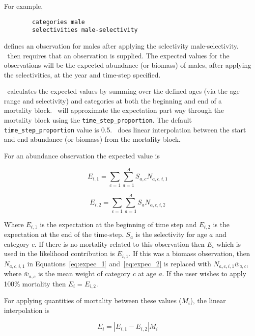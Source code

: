 For example,

{\small{\begin{verbatim}
		categories male
		selectivities male-selectivity
\end{verbatim}}}

defines an observation for males after applying the selectivity male-selectivity. \CNAME\ then requires that an observation is supplied. The expected values for the observations will be the expected abundance (or biomass) of males, after applying the selectivities, at the year and time-step specified.

\CNAME\ calculates the expected values by summing over the defined ages (via the age range and selectivity) and categories at both the beginning and end of a mortality block. \CNAME\ will approximate the expectation part way through the mortality block using the \texttt{time\_step\_proportion}. The default \texttt{time\_step\_proportion} value is 0.5. \CNAME\ does linear interpolation between the start and end abundance (or biomass) from the mortality block.

For an abundance observation the expected value is

\begin{equation}\label{eq:expec_1}
E_{i,1} = \sum_{c=1}^{} \sum_{a=1}^{A} S_{a,c} N_{a,c,i,1}
\end{equation}

\begin{equation}\label{eq:expec_2}
E_{i,2} = \sum_{c=1}^{} \sum_{a=1}^{A} S_a N_{a,c,i,2}
\end{equation}

Where $E_{i,1}$ is the expectation at the beginning of time step and $E_{i,2}$ is the expectation at the end of the time-step. $S_a$ is the selectivity for age $a$ and category $c$. If there is no mortality related to this observation then $E_i$ which is used in the likelihood contribution is $E_{i,1}$. If this was a biomass observation, then $N_{a,c,i,1}$ in Equations~\eqref{eq:expec_1} and~\eqref{eq:expec_2} is replaced with $N_{a,c,i,1} \bar{w}_{a,c}$, where $\bar{w}_{a,c}$ is the mean weight of category $c$ at age $a$. If the user wishes to apply 100\% mortality then $E_i = E_{i,2}$.

For applying quantities of mortality between these values ($M_i$), the linear interpolation is

\begin{equation}
E_{i} = |E_{i,1} - E_{i,2}|  M_i
\end{equation}

